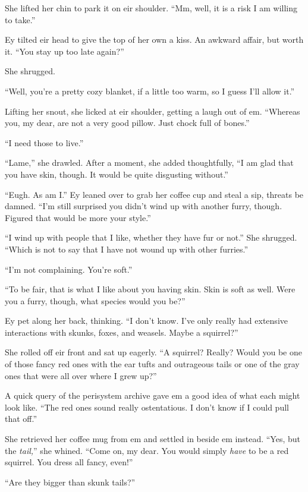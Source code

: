 She lifted her chin to park it on eir shoulder. ``Mm, well, it is a risk I am willing to take.''

Ey tilted eir head to give the top of her own a kiss. An awkward affair, but worth it. ``You stay up too late again?''

She shrugged.

``Well, you're a pretty cozy blanket, if a little too warm, so I guess I'll allow it.''

Lifting her snout, she licked at eir shoulder, getting a laugh out of em. ``Whereas you, my dear, are not a very good pillow. Just chock full of bones.''

``I need those to live.''

``Lame,'' she drawled. After a moment, she added thoughtfully, ``I am glad that you have skin, though. It would be quite disgusting without.''

``Eugh. As am I.'' Ey leaned over to grab her coffee cup and steal a sip, threats be damned. ``I'm still surprised you didn't wind up with another furry, though. Figured that would be more your style.''

``I wind up with people that I like, whether they have fur or not.'' She shrugged. ``Which is not to say that I have not wound up with other furries.''

``I'm not complaining. You're soft.''

``To be fair, that is what I like about you having skin. Skin is soft as well. Were you a furry, though, what species would you be?''

Ey pet along her back, thinking. ``I don't know. I've only really had extensive interactions with skunks, foxes, and weasels. Maybe a squirrel?''

She rolled off eir front and sat up eagerly. ``A squirrel? Really? Would you be one of those fancy red ones with the ear tufts and outrageous tails or one of the gray ones that were all over where I grew up?''

A quick query of the perisystem archive gave em a good idea of what each might look like. ``The red ones sound really ostentatious. I don't know if I could pull that off.''

She retrieved her coffee mug from em and settled in beside em instead. ``Yes, but the \emph{tail,}'' she whined. ``Come on, my dear. You would simply \emph{have} to be a red squirrel. You dress all fancy, even!''

``Are they bigger than skunk tails?''

